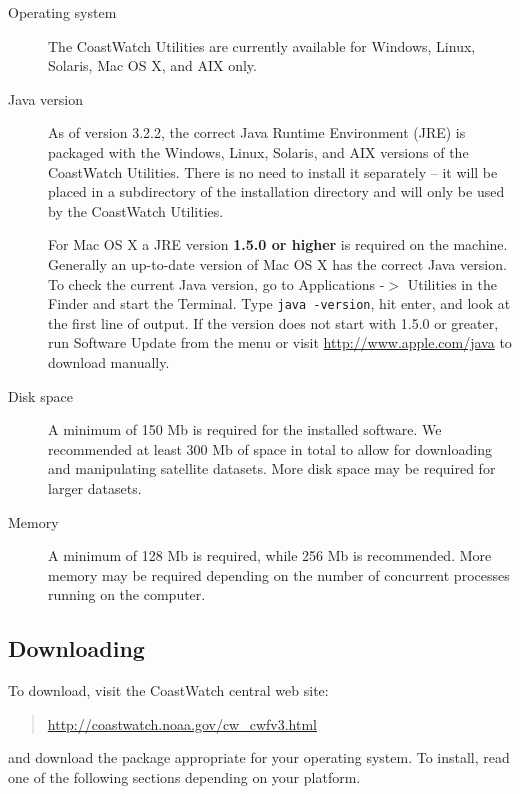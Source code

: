 \begin{description}

  \item[Operating system] The CoastWatch Utilities are currently
  available for Windows, Linux, Solaris, Mac OS X, and AIX only.

  \item[Java version] As of version 3.2.2, the correct Java Runtime
  Environment (JRE) is packaged with the Windows, Linux, Solaris,
  and AIX versions of the CoastWatch Utilities.  There is no need
  to install it separately -- it will be placed in a subdirectory
  of the installation directory and will only be used by the
  CoastWatch Utilities.

  For Mac OS X a JRE version {\bf 1.5.0 or higher} is required on
  the machine.  Generally an up-to-date version of Mac OS X has
  the correct Java version.  To check the current Java version,
  go to {\gui Applications} -$>$ {\gui Utilities} in the Finder and
  start the Terminal.  Type \verb+java -version+, hit enter, and
  look at the first line of output.  If the version does not
  start with 1.5.0 or greater, run {\gui Software Update} from the
   menu or visit \url{http://www.apple.com/java} to
  download manually.

  \item[Disk space] A minimum of 150 Mb is required for the installed
  software. We recommended at least 300 Mb of space in total to
  allow for downloading and manipulating satellite datasets. More
  disk space may be required for larger datasets.

  \item[Memory] A minimum of 128 Mb is required, while 256 Mb is
  recommended. More memory may be required depending on the number of
  concurrent processes running on the computer.

\end{description}

\subsection{Downloading}

To download, visit the CoastWatch central web site: 
\begin{quote}
  \url{http://coastwatch.noaa.gov/cw\_cwfv3.html}
\end{quote}
and download the package appropriate for your operating system. To
install, read one of the following sections depending on your
platform.

